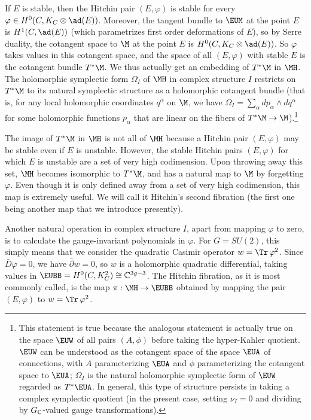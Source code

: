 If $E$ is stable, then the Hitchin pair $(E,\varphi)$ is stable
for every $\varphi\in H^0(C,K_C\otimes\ad(E))$.  Moreover, the
tangent bundle to ${\EUM}$ at the point $E$ is $H^1(C,\ad(E))$
(which parametrizes first order deformations of $E$), so by Serre
duality, the cotangent space to $\M$ at the point $E$ is
$H^0(C,K_C\otimes\ad(E))$. So $\varphi$ takes values in this
cotangent space, and the space of all $(E,\varphi)$ with stable
$E$ is the cotangent bundle $T^*\M$. We thus actually get an
embedding of $T^*\M$ in $\MH$.  The holomorphic symplectic form
$\Omega_I$ of $\MH$ in complex structure $I$ restricts on $T^*\M$
to its natural symplectic structure as a holomorphic cotangent
bundle (that is, for any local holomorphic coordinates $q^\alpha$
on $\M$, we have $\Omega_I=\sum_\alpha dp_\alpha\wedge dq^\alpha$
for some holomorphic functions $p_\alpha$ that are linear on the
fibers of $T^*\M\to \M$).\footnote{This statement is true because the
analogous statement is actually true on the space $\EUW$ of all
pairs $(A,\phi)$ before taking the hyper-Kahler quotient.  $\EUW$
can be understood as the cotangent space of the space ${\EUA}$ of
connections, with $A$ parameterizing ${\EUA}$ and $\phi$
parameterizing the cotangent space to ${\EUA}$; $\Omega_I$ is the
natural holomorphic symplectic form of ${\EUW}$ regarded as
$T^*{\EUA}$.  In general, this type of structure persists in
taking a complex symplectic quotient (in the present case, setting
$\nu_I=0$ and dividing by $G_{\Bbb{C}}$-valued gauge
transformations).}

The image of $T^*\M$ in $\MH$ is not all of $\MH$ because a
Hitchin pair $(E,\varphi)$ may be stable even if $E$ is unstable.
However, the stable Hitchin pairs $(E,\varphi)$ for which $E$ is
unstable are a set of very high codimension. Upon throwing away
this set, $\MH$ becomes isomorphic to $T^*\M$, and has a natural
map to $\M$ by forgetting $\varphi$. Even though it is only
defined away from a set of very high codimension, this map is
extremely useful.  We will call it Hitchin's second fibration (the
first one being another map that we introduce presently).

\par{}

Another natural operation in complex structure $I$, apart from
mapping $\varphi$ to zero, is to calculate the gauge-invariant
polynomials in $\varphi$. For $G=SU(2)$, this simply means that we
consider the quadratic Casimir operator $w=\Tr\,\varphi^2$. Since
$\bar D\varphi=0$, we have $\bar\partial w=0$, so $w$ is a
holomorphic quadratic differential, taking values in
${\EUBB}=H^0(C,K_C^2)\cong \Bbb{C}^{3g-3}$. The Hitchin fibration,
as it is most commonly called, is the map $\pi:\MH\to {\EUBB}$
obtained by mapping the pair $(E,\varphi)$ to $w=\Tr\,\varphi^2$.

